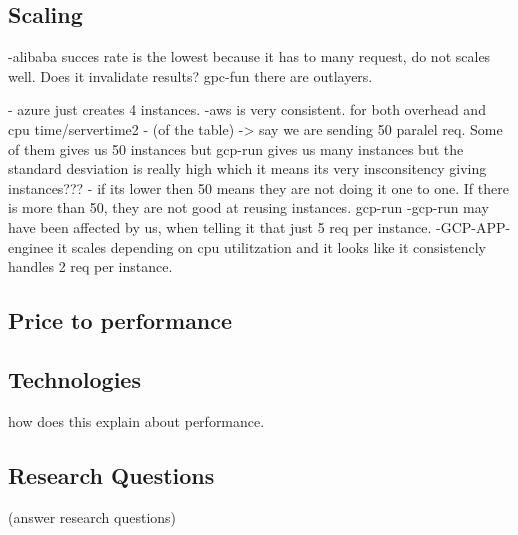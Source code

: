 \documentclass[11pt]{article}
\begin{document}
\subsection{Scaling}

-alibaba succes rate is the lowest because it has to many request, do not scales well. Does it invalidate results?
gpc-fun there are outlayers. 

- azure just creates 4 instances. 
-aws is very consistent. for both overhead and cpu time/servertime2
- (of the table) -> say we are sending 50 paralel req. Some of them gives us 50 instances but gcp-run gives us many instances but the standard desviation is really high which it means its very insconsitency giving instances???
- if its lower then 50 means they are not doing it one to one. If there is more than 50, they are not good at reusing instances. gcp-run 
-gcp-run may have been affected by us, when telling it that just 5 req per instance. 
-GCP-APP-enginee it scales depending on cpu utilitzation and it looks like it consistencly handles 2 req per instance. 

\subsection{Price to performance}


\subsection{Technologies}
how does this explain about performance. 

\subsection{Research Questions}
(answer research questions)




\end{document}
